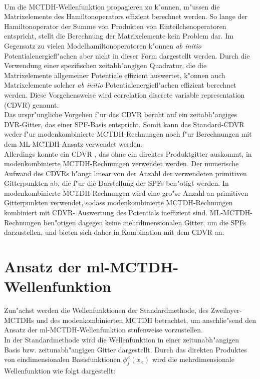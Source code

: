  \\Um die MCTDH-Wellenfunktion propagieren zu k"onnen, m"ussen die Matrixelemente des Hamiltonoperators effizient berechnet werden.
So lange der Hamiltonoperator der Summe von Produkten von Einteilchenoperatoren \cite{MMC1} entspricht, stellt die Berechnung der Matrixelemente kein Problem dar.
Im Gegensatz zu vielen Modelhamiltonoperatoren k"onnen \textit{ab initio} Potentialenergiefl"achen aber nicht in dieser Form dargestellt werden.
Durch die Verwendung einer spezifischen zeitabh"angigen Quadratur, die die Matrixelemente allgemeiner Potentiale effizient auswertet, k"onnen
auch Matrixelemente solcher \textit{ab initio} Potentialenergiefl"achen effizient berechnet werden.
Diese Vorgehensweise wird correlation discrete variable representation (CDVR) \cite{M3, vHM2} genannt.
 \\Das urspr"ungliche Vorgehen f"ur das CDVR \cite{M3} beruht auf ein zeitabh"angiges DVR-Gitter, das einer SPF-Basis entspricht.
Somit kann das Standard-CDVR weder f"ur modenkombinierte MCTDH-Rechnungen noch f"ur Berechnungen mit dem ML-MCTDH-Ansatz verwendet werden.
 \\Allerdings konnte ein CDVR , das ohne ein direktes Produktgitter auskommt, in modenkombinierte MCTDH-Rechnungen verwendet werden. \cite{vHM3}
 Der numerische Aufwand des CDVRs h"angt linear von der Anzahl der verwendeten primitiven Gitterpunkten ab, die f"ur die Darstellung der SPFs ben"otigt werden.
In modenkombinierte MCTDH-Rechnungen wird eine gro"se Anzahl an primitiven Gitterpunkten verwendet, sodass modenkombinierte MCTDH-Rechnungen kombiniert mit CDVR-
Auswertung des Potentials ineffizient sind. ML-MCTDH-Rechnungen ben"otigen dagegen keine mehrdimensionalen Gitter, um die SPFs darzustellen, und bieten sich
daher in Kombination mit dem CDVR an.





\section{Ansatz der ml-MCTDH-Wellenfunktion}
Zun"achst  werden die Wellenfunktionen der Standardmethode, des Zweilayer-MCTDHs und des moden\-kombi\-nierten MCTDH betrachtet,
 um anschlie"send den Ansatz der ml-MCTDH-Wellenfunktion
stufenweise vorzustellen.
\\In der Standardmethode wird die Wellenfunktion in einer zeitunabh"angigen Basis bzw. zeitunabh"angigen Gitter dargestellt.
Durch das direkten Produktes von eindimensionalen Basisfunktionen $\phi^{\kappa}_{j}(x_{\kappa})$ wird die mehrdimensionale Wellenfunktion wie folgt 
dargestellt:

